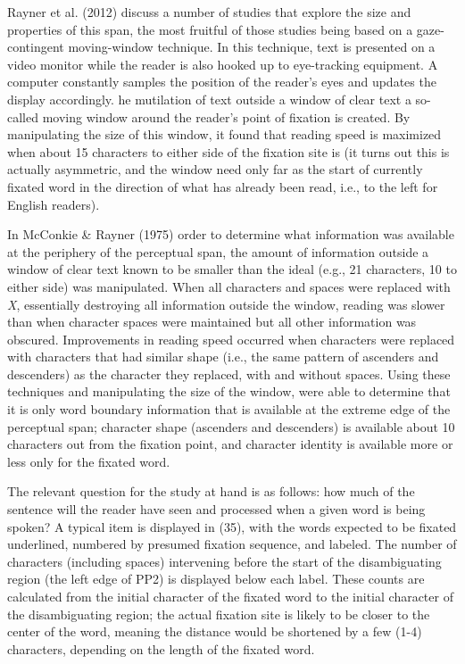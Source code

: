 \documentclass[12pt,oneside]{book}
\begin{document}
Rayner et al. (2012) discuss a number of studies that explore the size and properties of this span, the most fruitful of those studies being based on a gaze-contingent moving-window technique. In this technique, text is presented on a video monitor while the reader is also hooked up to eye-tracking equipment. A computer constantly samples the position of the reader's eyes and updates the display accordingly. he mutilation of text outside a window of clear text a so-called moving window around the reader's point of fixation is created. By manipulating the size of this window, it  found that reading speed is maximized when about 15 characters to either side of the fixation site is  (it turns out this is actually asymmetric, and the window need only  far as the start of  currently fixated word in the direction of what has already been read, i.e., to the left for English readers).

In  McConkie \& Rayner (1975) order to determine what information was available at the periphery of the perceptual span, the amount of information outside a window of clear text known to be smaller than the ideal (e.g., 21 characters, 10 to either side) was manipulated. When all  characters and spaces were replaced with \emph{X}, essentially destroying all information outside the window, reading was slower than when character spaces were maintained\deleted{,} but all other information was obscured. Improvements in reading speed  occurred when  characters  were replaced with characters that had similar shape (i.e., the same pattern of ascenders and descenders) as the character they replaced, with and without spaces. Using these techniques and manipulating the size of the window,  were able to determine that it is only word boundary information that is available at the extreme edge of the perceptual span; character shape (ascenders and descenders) is available about 10 characters out from the fixation point, and character identity is available more or less only for the fixated word.

The relevant question for the study at hand is as follows: how much of the sentence will the reader have seen and processed when a given word is being spoken? A typical item  is displayed in (35), with the words expected to be fixated underlined, numbered by presumed fixation sequence, and labeled. The number of characters (including spaces) intervening before the start of the disambiguating region (the left edge of PP2) is displayed below each label. These counts are calculated from the initial character of the fixated word to the initial character of the disambiguating region; the actual fixation site is likely to be closer to the center of the word, meaning the distance would be shortened by a few (1-4) characters, depending on the length of the fixated word.
\end{document}
